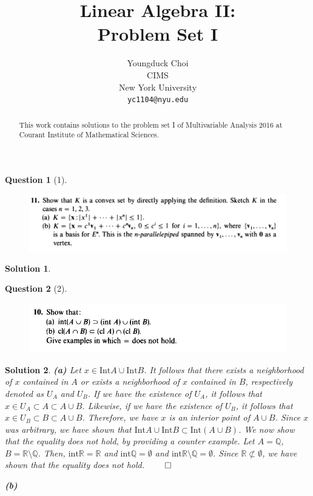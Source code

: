 \documentclass{article} %
\title{Linear Algebra II: \\
Problem Set I}
\author{
Youngduck Choi \\
CIMS \\
New York University\\
\texttt{yc1104@nyu.edu} \\
}
\theoremstyle{quest}
\newtheorem*{question}{Question}
\newtheorem*{solution}{Solution}
\begin{document}
\maketitle

\begin{abstract}
This work contains solutions to the problem set I
of Multivariable Analysis 2016 at Courant Institute of Mathematical Sciences.
\end{abstract}

\bigskip

\begin{question}[1]
\hfill
\begin{figure}[h!]
  \centering
    \includegraphics[width=1\textwidth]{MV-1-3-11.png}
\end{figure}
\end{question}
\begin{solution}
\end{solution}

\newpage

\begin{question}[2]
\hfill
\begin{figure}[h!]
  \centering
    \includegraphics[width=1\textwidth]{MV-1-4-10.png}
\end{figure}
\end{question}
\begin{solution}
\textbf{(a)}
Let $x \in \text{Int} A \cup \text{Int} B$. It follows that there exists a neighborhood of 
$x$ contained in $A$ or exists a neighborhood of $x$ contained in $B$, respectively denoted 
as $U_A$ and $U_B$. If we have the existence of $U_A$, it follows that 
$x \in U_A \subset A \subset A \cup B$. Likewise, if we have the existence of $U_B$, it follows
that $x \in U_B \subset B \subset A \cup B$. Therefore, we have $x$ is an interior point of $A
\cup B$.
Since $x$ was arbitrary, we have shown that $\text{Int} A \cup \text{Int} B 
\subset \text{Int}(A \cup B)$. We now show that the equality does not hold, by providing
a counter example. Let $A = \mathbb{Q}$, $B = \mathbb{R\setminus Q}$. Then, 
$\text{int}\mathbb{R} = \mathbb{R}$ and $\text{int}\mathbb{Q} = \emptyset$ and 
$\text{int}\mathbb{R\setminus Q} = \emptyset$. Since $\mathbb{R} \not\subset
\emptyset$, we have shown that the equality does not hold. \hfill $\qed$  

\bigskip

\textbf{(b)}

 
\end{solution}
\end{document}
